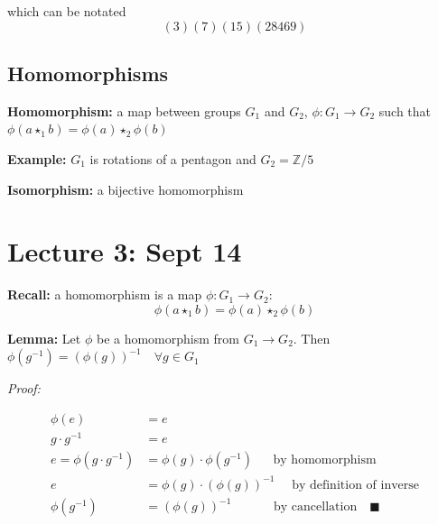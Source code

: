 \documentclass[12pt]{report}
\newcommand{\qed}{\quad \blacksquare}
\newcommand{\Z}{\mathbb{Z}}
\begin{document}
\usetikzlibrary{chains}
\begin{center}
\end{center}

which can be notated
\[(3)(7)(15)(28469)\]

\subsection*{Homomorphisms}
\textbf{Homomorphism:} a map between groups $G_1$ and $G_2$, $\phi: G_1 \to G_2$ such that $\phi(a \star_1 b) = \phi(a) \star_2 \phi(b)$

\textbf{Example:} $G_1$ is rotations of a pentagon and $G_2 = \Z/5$

\textbf{Isomorphism:} a bijective homomorphism

\section*{Lecture 3: Sept 14}
\textbf{Recall:} a homomorphism is a map $\phi : G_1 \to G_2:$
\[\phi(a \star_1 b) = \phi(a) \star_2 \phi(b)\] 

\textbf{Lemma:} Let $\phi$ be a homomorphism from $G_1 \to G_2$. Then $\phi(g^{-1}) = (\phi(g))^{-1} \quad \forall g \in G_1$

\emph{Proof:} 

\begin{align*}
    \phi(e) &= e\\
    g\cdot g^{-1} &= e\\
    e = \phi(g\cdot g^{-1}) &= \phi(g) \cdot \phi(g^{-1}) \quad \; \text{ by homomorphism}\\
    e &= \phi(g) \cdot (\phi(g))^{-1} \quad \text{ by definition of inverse}\\
    \phi(g^{-1}) &= (\phi(g))^{-1} \qquad \quad \text{ by cancellation} \qed
\end{align*}
\end{document}
